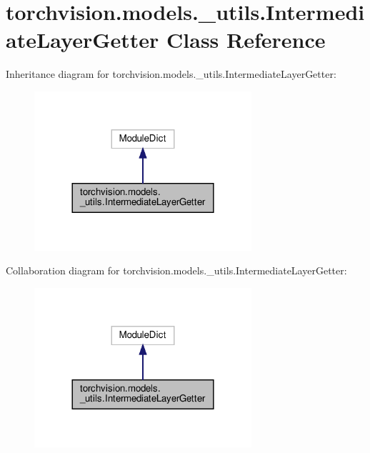 \hypertarget{classtorchvision_1_1models_1_1__utils_1_1IntermediateLayerGetter}{}\section{torchvision.\+models.\+\_\+utils.\+Intermediate\+Layer\+Getter Class Reference}
\label{classtorchvision_1_1models_1_1__utils_1_1IntermediateLayerGetter}


Inheritance diagram for torchvision.\+models.\+\_\+utils.\+Intermediate\+Layer\+Getter\+:
\nopagebreak
\begin{figure}[H]
\begin{center}
\leavevmode
\includegraphics[width=228pt]{classtorchvision_1_1models_1_1__utils_1_1IntermediateLayerGetter__inherit__graph}
\end{center}
\end{figure}


Collaboration diagram for torchvision.\+models.\+\_\+utils.\+Intermediate\+Layer\+Getter\+:
\nopagebreak
\begin{figure}[H]
\begin{center}
\leavevmode
\includegraphics[width=228pt]{classtorchvision_1_1models_1_1__utils_1_1IntermediateLayerGetter__coll__graph}
\end{center}
\end{figure}

